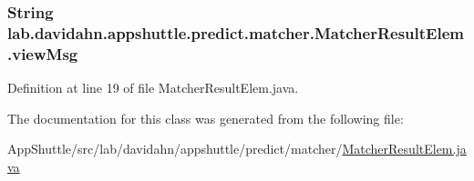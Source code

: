 \hypertarget{classlab_1_1davidahn_1_1appshuttle_1_1predict_1_1matcher_1_1_matcher_result_elem_a2816b3b8c2973cef2f5def0255caed0f}{
\subsubsection[{view\-Msg}]{\setlength{\rightskip}{0pt plus 5cm}\-String {\bf lab.\-davidahn.\-appshuttle.\-predict.\-matcher.\-Matcher\-Result\-Elem.\-view\-Msg}}}\label{classlab_1_1davidahn_1_1appshuttle_1_1predict_1_1matcher_1_1_matcher_result_elem_a2816b3b8c2973cef2f5def0255caed0f}


\-Definition at line 19 of file \-Matcher\-Result\-Elem.\-java.



\-The documentation for this class was generated from the following file\-:\begin{DoxyCompactItemize}
\item 
\-App\-Shuttle/src/lab/davidahn/appshuttle/predict/matcher/\hyperlink{_matcher_result_elem_8java}{\-Matcher\-Result\-Elem.\-java}\end{DoxyCompactItemize}
